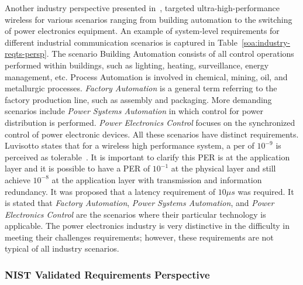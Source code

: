 Another industry perspective presented in~\cite{Luvisotto2017}, targeted ultra-high-performance wireless for various scenarios ranging from building automation to the switching of power electronics equipment. An example of system-level requirements for different industrial communication scenarios is captured in Table~\ref{soa:industry-reqts-persp}. The scenario Building Automation consists of all control operations performed within buildings, such as lighting, heating, surveillance, energy management, etc. Process Automation is involved in chemical, mining, oil, and metallurgic processes. \textit{Factory Automation} is a general term referring to the factory production line, such as assembly and packaging. More demanding scenarios include \textit{Power Systems Automation} in which control for power distribution is performed. \textit{Power Electronics Control} focuses on the synchronized control of power electronic devices. All these scenarios have distinct requirements. Luvisotto states that for a wireless high performance system, a \gls{per} of $10^{-9}$ is perceived as tolerable~\cite{Luvisotto2017}. It is important to clarify this PER is at the application layer and it is possible to have a PER of $10^{-1}$ at the physical layer and still achieve $10^{-8}$ at the application layer with transmission and information redundancy. It was proposed that a latency requirement of $10{\mu}s$ was required. It is stated that \textit{Factory Automation}, \textit{Power Systems Automation}, and \textit{Power Electronics Control} are the scenarios where their particular technology is applicable. The power electronics industry is very distinctive in the difficulty in meeting their challenges requirements; however, these requirements are not typical of all industry scenarios.

\subsubsection{NIST Validated Requirements Perspective}\label{sec:litreview:nist}


